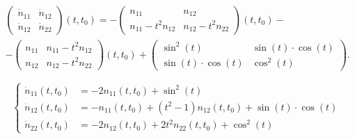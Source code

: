 \begin{solution}
    \begin{multline*}
        \begin{pmatrix} \dot n_{11} & \dot n_{12} \\ \dot n_{12} & \dot n_{22} \end{pmatrix} (t, t_0) = - \begin{pmatrix} n_{11} & n_{12} \\ n_{11} - t^2n_{12} & n_{12} - t^2n_{22} \end{pmatrix} (t, t_0) - \\ 
        - \begin{pmatrix} n_{11} & n_{11} - t^2n_{12} \\ n_{12} & n_{12} - t^2n_{22} \end{pmatrix}(t, t_0) + \begin{pmatrix} \sin^2(t) & \sin(t)\cdot \cos(t) \\ \sin(t) \cdot \cos(t) & \cos^2(t) \end{pmatrix}.
    \end{multline*} 
    
    \begin{equation*}
        \left\{
            \begin{aligned}
                \dot n_{11} (t, t_0) &= - 2n_{11} (t, t_0) + \sin^2(t) \\
                \dot n_{12} (t, t_0) &= - n_{11} (t, t_0) + (t^2 - 1) n_{12} (t, t_0) + \sin(t)\cdot \cos(t) \\
                \dot n_{22} (t, t_0) &= - 2n_{12} (t, t_0) + 2t^2 n_{22} (t, t_0) + \cos^2(t)
            \end{aligned}
        \right.
    \end{equation*}
\end{solution}

